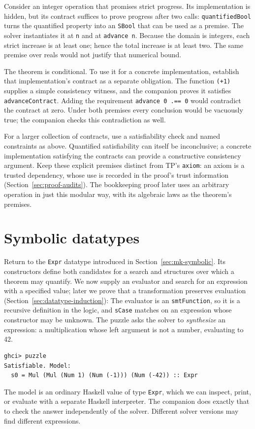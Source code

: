 \documentclass[review]{jfp-epi}
\newcommand{\code}[1]{\texttt{#1}}
\begin{document}
Consider an integer operation that promises strict progress. Its implementation
is hidden, but its contract suffices to prove progress after two calls:
\code{quantifiedBool} turns the quantified property into an \code{SBool} that
can be used as a premise. The solver instantiates it at \code{n} and at
\code{advance n}. Because the domain is integers, each strict increase is at
least one; hence the total increase is at least two. The same premise over reals
would not justify that numerical bound.

The theorem is conditional. To use it for a concrete implementation, establish
that implementation's contract as a separate obligation. The function
\code{(+1)} supplies a simple consistency witness, and the companion proves it
satisfies \code{advanceContract}. Adding the requirement \code{advance 0 .== 0}
would contradict the contract at zero. Under both premises every conclusion
would be vacuously true; the companion checks this contradiction as well.

For a larger collection of contracts, use a satisfiability check and named
constraints as above. Quantified satisfiability can itself be inconclusive;
a concrete implementation satisfying the contracts can provide a constructive
consistency argument. Keep these explicit premises distinct from TP's
\code{axiom}: an axiom is a trusted dependency, whose use is recorded in the
proof's trust information (Section~\ref{sec:proof-audits}). The bookkeeping proof
later uses an arbitrary operation in just this modular way, with its algebraic
laws as the theorem's premises.


\section{Symbolic datatypes}
\label{sec:datatypes}

Return to the \code{Expr} datatype introduced in Section~\ref{sec:mk-symbolic}.
Its constructors define both candidates for a search and structures over which
a theorem may quantify. We now supply an evaluator and search for an expression
with a specified value; later we prove that a transformation preserves evaluation
(Section~\ref{sec:datatype-induction}):
The evaluator is an \code{smtFunction}, so it is a recursive definition in the
logic, and \code{sCase} matches on an expression whose constructor may be
unknown. The puzzle asks the solver to \emph{synthesize} an expression: a
multiplication whose left argument is not a number, evaluating to 42.
\begin{lstlisting}[style=output]
ghci> puzzle
Satisfiable. Model:
  s0 = Mul (Mul (Num 1) (Num (-1))) (Num (-42)) :: Expr
\end{lstlisting}
The model is an ordinary Haskell value of type \code{Expr}, which we can inspect,
print, or evaluate with a separate Haskell interpreter. The companion does exactly
that to check the answer independently of the solver. Different solver versions
may find different expressions.
\end{document}
